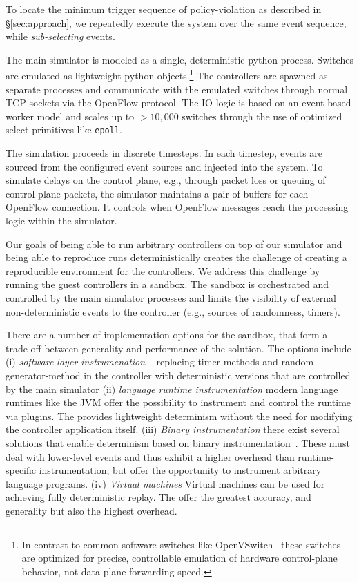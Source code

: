 To locate the minimum trigger sequence of policy-violation as described in
\S\ref{sec:approach}, we repeatedly execute the system over the same event sequence,
while \emph{sub-selecting} events.

 The main simulator is modeled as a single,
deterministic python process. Switches are emulated as lightweight python
objects.\footnote{In contrast to common software switches like
OpenVSwitch~\cite{openvswitch} these switches are optimized for precise,
controllable emulation of hardware control-plane behavior, not data-plane
forwarding speed.} The controllers are spawned as separate processes and
communicate with the emulated switches through normal TCP sockets via the
OpenFlow protocol. The IO-logic is based on an event-based worker model and
scales up to $>10,000$ switches through the use of optimized select primitives
like \texttt{epoll}.

The simulation proceeds in discrete timesteps. In each timestep, events are
sourced from the configured event sources and injected into the system. To
simulate delays on the control plane, e.g., through packet loss or queuing of
control plane packets, the simulator maintains a pair of buffers for each
OpenFlow connection. It controls when OpenFlow messages reach the processing
logic within the simulator.

Our goals of being able to run arbitrary controllers on top of our simulator
and being able to reproduce runs deterministically creates the challenge
of creating a reproducible environment for the controllers. We address this
challenge by running the guest controllers in a sandbox. The sandbox is 
orchestrated and controlled by the main simulator processes and limits
the visibility of external non-deterministic events to the controller (e.g.,
sources of randomness, timers).

There are a number of implementation options for the sandbox, that form a
trade-off between generality and performance of the solution. The options
include (i) \emph{software-layer instrumenation} -- replacing timer methods and
random generator-method in the controller with deterministic versions that are
controlled by the main simulator (ii) \emph{language runtime instrumentation}
modern language runtimes like the JVM offer the possibility to instrument and
control the runtime via plugins. The provides lightweight determinism without
the need for modifying the controller application itself. (iii) \emph{Binary
instrumentation} there exist several solutions that enable determinism based on
binary instrumentation~\cite{XXX}. These must deal with lower-level events and
thus exhibit a higher overhead than runtime-specific instrumentation, but offer
the opportunity to instrument arbitrary language programs. (iv) \emph{Virtual machines}
Virtual machines can be used for achieving fully deterministic replay. The
offer the greatest accuracy, and generality but also the highest overhead.

